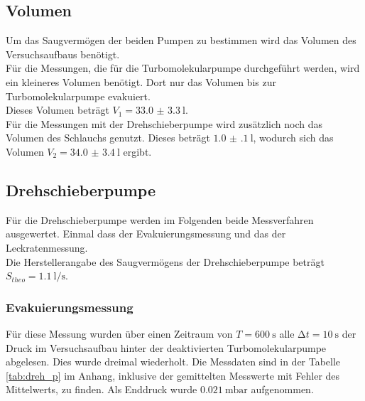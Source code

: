       \subsection{Volumen}
        Um das Saugvermögen der beiden Pumpen zu bestimmen wird das Volumen des Versuchsaufbaus benötigt.\\
        Für die Messungen, die für die Turbomolekularpumpe durchgeführt werden, wird ein kleineres Volumen benötigt.
        Dort nur das Volumen bis zur Turbomolekularpumpe evakuiert.\\
        Dieses Volumen beträgt $V_1 = \SI{33.0(33)}{\litre}$.\\
        Für die Messungen mit der Drehschieberpumpe wird zusätzlich noch das Volumen des Schlauchs genutzt. 
        Dieses beträgt $\SI{1.0(1)}{\litre}$, wodurch sich das Volumen $V_2 = \SI{34.0(34)}{\litre}$ ergibt.\\



      \subsection{Drehschieberpumpe}

        \noindent Für die Drehschieberpumpe werden im Folgenden beide Messverfahren ausgewertet. Einmal dass der Evakuierungsmessung und das der Leckratenmessung.\\
        Die Herstellerangabe des Saugvermögens der Drehschieberpumpe beträgt $ S_{theo} = \SI{1.1}{\litre\per\second}$\cite{V70}.

        \subsubsection{Evakuierungsmessung}

        \noindent Für diese Messung wurden über einen Zeitraum von $ T = \SI{600}{\second}$ alle $ \increment t = \SI{10}{\second}$
        der Druck im Versuchsaufbau hinter der deaktivierten Turbomolekularpumpe abgelesen. Dies wurde dreimal wiederholt.
        Die Messdaten sind in der Tabelle \ref{tab:dreh_p} im Anhang, inklusive der gemittelten Messwerte mit Fehler des Mittelwerts, zu finden.
        Als Enddruck wurde $\SI{0.021}{\milli\bar}$ aufgenommen. 
        \\\\
        
